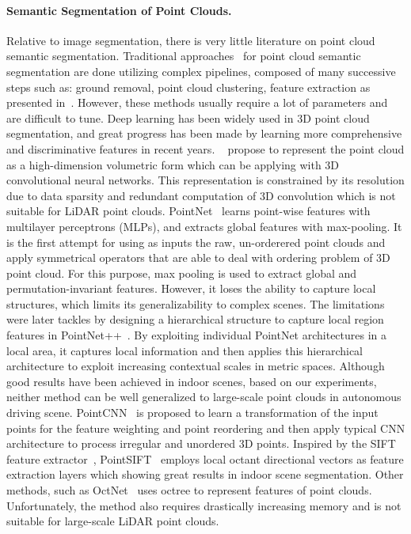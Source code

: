 \documentclass{sip}%
\begin{document}
\paragraph{Semantic Segmentation of Point Clouds.}
Relative to image segmentation, there is very little literature on point cloud semantic segmentation.
Traditional approaches~\cite{chen2003visual,sun2009concise} for point cloud semantic segmentation are done utilizing complex pipelines, composed of many successive steps such as: ground removal, point cloud clustering, feature extraction as presented in~\cite{feng2014fast,himmelsbach2008lidar}. 
However, these methods usually require a lot of parameters and are difficult to tune.
Deep learning has been widely used in 3D point cloud segmentation, and great progress has been made by learning more comprehensive and discriminative features in recent years. 
~\cite{qi2016volumetric,tchapmi2017segcloud,wu20153d} propose to represent the
point cloud as a high-dimension volumetric form which can be applying with 3D convolutional neural networks. This representation is constrained by its resolution due to data sparsity and redundant computation of
3D convolution which is not suitable for LiDAR point clouds.
PointNet~\cite{qi2017pointnet} learns point-wise features with multilayer perceptrons (MLPs), and extracts global features with max-pooling. 
It is the first attempt for using as inputs the raw, un-orderered point clouds and apply symmetrical operators that are able to deal with ordering problem of 3D point cloud.
For this purpose, max pooling is used to extract global and permutation-invariant features.
However, it loses the ability to capture local structures, which limits its generalizability to complex scenes.
The limitations were later tackles by designing a hierarchical structure to capture local region features in PointNet++~\cite{qi2017pointnet++}. 
By exploiting individual PointNet architectures in a local area, it captures local information and then applies this hierarchical architecture to exploit increasing contextual scales in metric spaces.
%
Although good results have been achieved in indoor scenes, based on our experiments, neither method can be well generalized to large-scale point clouds in autonomous driving scene.
PointCNN~\cite{li2018pointcnn} is proposed to learn a transformation of the input points for the feature weighting and point reordering and then apply typical CNN architecture to process irregular and unordered 3D points.
Inspired by the SIFT feature extractor~\cite{lowe2004distinctive}, PointSIFT~\cite{jiang2018pointsift} employs local octant directional vectors as feature extraction layers which showing great results in indoor scene segmentation.
Other methods, such as OctNet~\cite{riegler2017octnet} uses octree to represent features of point clouds.
Unfortunately, the method also requires drastically increasing memory and is not suitable for large-scale LiDAR point clouds.
\end{document}
